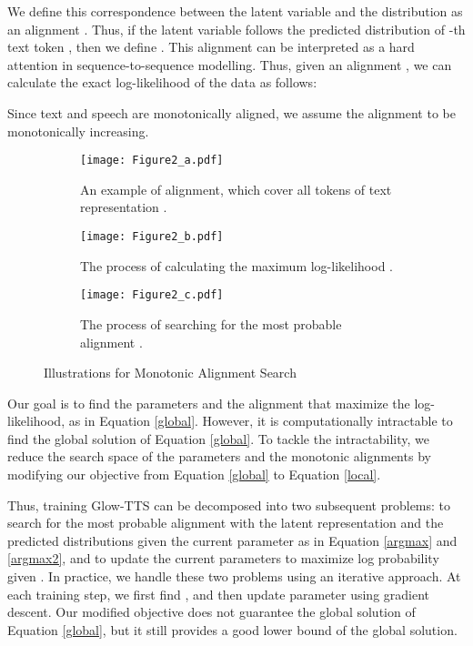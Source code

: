 \documentclass{article}
\begin{document}
We define this correspondence between the latent variable and the distribution as an alignment . Thus, if the latent variable  follows the predicted distribution of -th text token , then we define   . This alignment can be interpreted as a hard attention in sequence-to-sequence modelling. Thus, given an alignment , we can calculate the exact log-likelihood of the data as follows: 




Since text and speech are monotonically aligned, we assume the alignment  to be monotonically increasing. 


\begin{figure*}[t]
    \centering
    \begin{subfigure}[b]{.31\textwidth}
        \centering
        \texttt{[image: Figure2\_a.pdf]}
        \caption{An example of alignment, which cover all tokens of text representation .}
        \label{fig2:figure_a}
    \end{subfigure}\hspace*{\fill}
    \begin{subfigure}[b]{.31\textwidth}
        \centering
        \texttt{[image: Figure2\_b.pdf]}
        \caption{The process of calculating the maximum log-likelihood .}
        \label{fig2:figure_b}
    \end{subfigure}\hspace*{\fill}
    \begin{subfigure}[b]{.31\textwidth}
        \centering
        \texttt{[image: Figure2\_c.pdf]}
        \caption{The process of searching for the most probable alignment .}
        \label{fig2:figure_c}
    \end{subfigure}
    \caption{Illustrations for Monotonic Alignment Search}
    \label{fig2}
\end{figure*}

Our goal is to find the parameters  and the alignment  that maximize the log-likelihood, as in Equation \ref{global}. However, it is computationally intractable to find the global solution of Equation \ref{global}. To tackle the intractability, we reduce the search space of the parameters  and the monotonic alignments  by modifying our objective from Equation \ref{global} to Equation \ref{local}.





Thus, training Glow-TTS can be decomposed into two subsequent problems:  to search for the most probable alignment  with the latent representation  and the predicted distributions given the current parameter  as in Equation \ref{argmax} and \ref{argmax2}, and  to update the current parameters  to maximize log probability  given . In practice, we handle these two problems using an iterative approach. At each training step, we first find , and then update parameter  using gradient descent. Our modified objective does not guarantee the global solution of Equation \ref{global}, but it still provides a good lower bound of the global solution.
\end{document}
